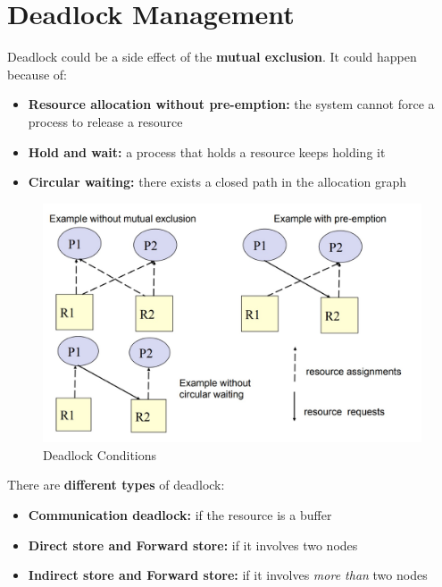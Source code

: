 \section{Deadlock Management}
Deadlock could be a side effect of the \textbf{mutual exclusion}. It could happen because of:
\begin{itemize}
    \item \textbf{Resource allocation without pre-emption:} the system cannot force a process to release a resource
    \item \textbf{Hold and wait:} a process that holds a resource keeps holding it
    \item \textbf{Circular waiting:} there exists a closed path in the allocation graph
\end{itemize}
\begin{figure}[!h]
    \centering
    \includegraphics[width=.8\linewidth]{images/SynchronizationCoordinationDS/deadlock.jpeg}
    \caption{Deadlock Conditions}
\end{figure}
There are \textbf{different types} of deadlock:
\begin{itemize}
    \item \textbf{Communication deadlock:} if the resource is a buffer
    \item \textbf{Direct store and Forward store:} if it involves two nodes
    \item \textbf{Indirect store and Forward store:} if it involves \textit{more than} two nodes
\end{itemize}

